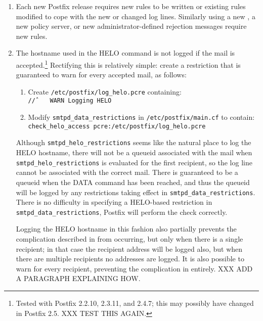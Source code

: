 \begin{enumerate}

    \item Each new Postfix release requires new rules to be written or
        existing rules modified to cope with the new or changed log lines.
        Similarly using a new , a new policy server, or new
        administrator-defined rejection messages require new rules.

    \item The hostname used in the HELO command is not logged if the mail
        is accepted.\footnote{Tested with Postfix 2.2.10, 2.3.11, and
        2.4.7; this may possibly have changed in Postfix 2.5. XXX TEST THIS
        AGAIN.}  Rectifying this is relatively simple: create a restriction
        that is guaranteed to warn for every accepted mail, as follows:

        \begin{enumerate}

            \item Create \texttt{/etc/postfix/log\_helo.pcre}
                containing:\newline{}
                \tab{}\texttt{/\^/~~~~WARN~Logging~HELO}

            \item Modify \texttt{smtpd\_data\_restrictions} in
                \texttt{/etc/postfix/main.cf} to contain:\newline{}
                \tab{}\texttt{check\_helo\_access~pcre:/etc/postfix/log\_helo.pcre}

        \end{enumerate}

        Although \texttt{smtpd\_helo\_restrictions} seems like the natural
        place to log the HELO hostname, there will not be a queueid
        associated with the mail when \texttt{smtpd\_helo\_restrictions} is
        evaluated for the first recipient, so the log line cannot be
        associated with the correct mail.  There is guaranteed to be a
        queueid when the DATA command has been reached, and thus the
        queueid will be logged by any restrictions taking effect in
        \texttt{smtpd\_data\_restrictions}.  There is no difficulty in
        specifying a HELO-based restriction in
        \texttt{smtpd\_data\_restrictions}, Postfix will perform the check
        correctly.

        Logging the HELO hostname in this fashion also partially prevents
        the complication described in  from occurring, but only when there is a
        single recipient; in that case the recipient address will be logged
        also, but when there are multiple recipients no addresses are
        logged.  It is also possible to warn for every recipient,
        preventing the complication in  entirely.  XXX ADD A PARAGRAPH EXPLAINING
        HOW\@.


\end{enumerate}
